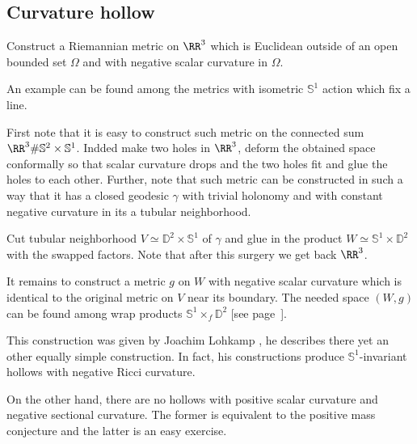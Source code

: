 \subsection*{Curvature hollow}
\label{Curvature hollow}

\begin{pr}
Construct a Riemannian metric on $\RR^3$ 
which is Euclidean outside of an open bounded set $\Omega$ 
and with negative scalar curvature in $\Omega$.
\end{pr}

An example can be found among the  metrics with isometric $\mathbb{S}^1$ action which fix a line.

\medskip

First note that it is easy to construct such metric on the connected sum
$\RR^3\#\mathbb{S}^2\times\mathbb{S}^1$.
Indded make two holes in $\RR^3$, deform the obtained space conformally so that scalar curvature drops and the two holes fit and glue the holes to each other.
Further, note that such metric can be constructed in such a way that it has a closed geodesic $\gamma$ with trivial holonomy and with constant negative curvature in its a tubular neighborhood.

Cut tubular neighborhood $V\simeq\mathbb{D}^2\times \mathbb{S}^1$ of $\gamma$ 
and glue in the product $W\simeq\mathbb{S}^1\times \mathbb{D}^2$ with the swapped factors. 
Note that after this surgery we get back $\RR^3$.

It remains to construct a metric $g$ on $W$ with negative scalar curvature which 
is identical to the original metric on $V$ near its boundary.
The needed space $(W,g)$ can be found among wrap products $\mathbb{S}^1\times_f \mathbb{D}^2$ [see page~\pageref{page:warped product}].
\qeds


This construction was given by Joachim Lohkamp \cite[see][]{lohkamp},
he describes there yet an other equally simple construction.
In fact,
his constructions produce 
$\mathbb{S}^1$-invariant hollows 
with negative Ricci curvature.

On the other hand,
there are no hollows with 
positive scalar curvature and negative sectional curvature.
The former is equivalent to the positive mass conjecture \cite[see][and the references therein]{witten}
and the latter is an easy exercise.












